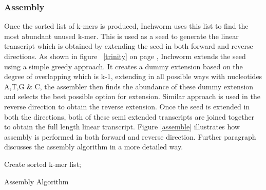 \label{key}\documentclass[plainarticle, english ,zihtitle,final,hyperref,utf8]{zihpub}
\begin{document}
\subsubsection{Assembly}
Once the sorted list of k-mers is produced, Inchworm uses this list to find the most abundant unused k-mer. This is used as a seed to generate the linear transcript which is obtained by extending the seed in both forward and reverse directions. As shown in figure ~\ref{trinity} on page \pageref{trinity}, Inchworm extends the seed using a simple greedy approach. It creates a dummy extension based on the degree of overlapping which is k-1, extending in all possible ways with nucleotides A,T,G \& C, the assembler then finds the abundance of these dummy extension and selects the best possible option for extension. Similar approach is used in the reverse direction to obtain the reverse extension. Once the seed is extended in both the directions, both of these semi extended transcripts are joined together to obtain the full length linear transcript. Figure \ref{assemble} illustrates how assembly is performed in both forward and reverse direction. Further paragraph discusses the assembly algorithm in a more detailed way.
\vspace{20pt}
 \begin{algorithm}[H]
 Create sorted k-mer list;\\
 \caption{Assembly Algorithm}
\end{algorithm}
\end{document}
